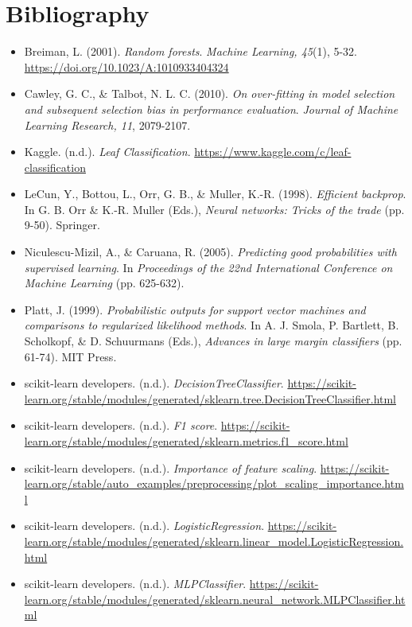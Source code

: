 \section{Bibliography}
\sloppy

\begin{itemize}
    \item Breiman, L. (2001). \emph{Random forests}. \emph{Machine Learning, 45}(1), 5-32. \url{https://doi.org/10.1023/A:1010933404324}
    \item Cawley, G. C., \& Talbot, N. L. C. (2010). \emph{On over-fitting in model selection and subsequent selection bias in performance evaluation}. \emph{Journal of Machine Learning Research, 11}, 2079-2107.
    \item Kaggle. (n.d.). \emph{Leaf Classification}. \url{https://www.kaggle.com/c/leaf-classification}
    \item LeCun, Y., Bottou, L., Orr, G. B., \& Muller, K.-R. (1998). \emph{Efficient backprop}. In G. B. Orr \& K.-R. Muller (Eds.), \emph{Neural networks: Tricks of the trade} (pp. 9-50). Springer.
    \item Niculescu-Mizil, A., \& Caruana, R. (2005). \emph{Predicting good probabilities with supervised learning}. In \emph{Proceedings of the 22nd International Conference on Machine Learning} (pp. 625-632).
    \item Platt, J. (1999). \emph{Probabilistic outputs for support vector machines and comparisons to regularized likelihood methods}. In A. J. Smola, P. Bartlett, B. Scholkopf, \& D. Schuurmans (Eds.), \emph{Advances in large margin classifiers} (pp. 61-74). MIT Press.
    \item scikit-learn developers. (n.d.). \emph{DecisionTreeClassifier}. \url{https://scikit-learn.org/stable/modules/generated/sklearn.tree.DecisionTreeClassifier.html}
    \item scikit-learn developers. (n.d.). \emph{F1 score}. \url{https://scikit-learn.org/stable/modules/generated/sklearn.metrics.f1_score.html}
    \item scikit-learn developers. (n.d.). \emph{Importance of feature scaling}. \url{https://scikit-learn.org/stable/auto_examples/preprocessing/plot_scaling_importance.html}
    \item scikit-learn developers. (n.d.). \emph{LogisticRegression}. \url{https://scikit-learn.org/stable/modules/generated/sklearn.linear_model.LogisticRegression.html}
    \item scikit-learn developers. (n.d.). \emph{MLPClassifier}. \url{https://scikit-learn.org/stable/modules/generated/sklearn.neural_network.MLPClassifier.html}

\end{itemize}

